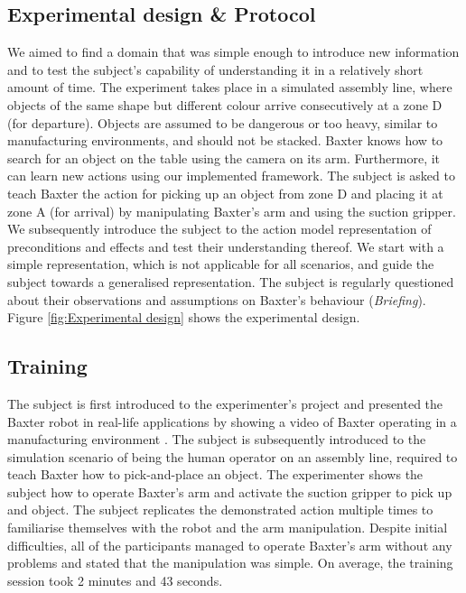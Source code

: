 \subsection{Experimental design \& Protocol}
We aimed to find a domain that was simple enough to introduce new information and to test the subject's capability of understanding it in a relatively short amount of time. The experiment takes place in a simulated assembly line, where objects of the same shape but different colour arrive consecutively at a zone D (for departure). Objects are assumed to be dangerous or too heavy, similar to manufacturing environments, and should not be stacked. Baxter knows how to search for an object on the table using the camera on its arm. Furthermore, it can learn new actions using our implemented framework. The subject is asked to teach Baxter the action for picking up an object from zone D and placing it at zone A (for arrival) by manipulating Baxter's arm and using the suction gripper. We subsequently introduce the subject to the action model representation of preconditions and effects and test their understanding thereof. We start with a simple representation, which is not applicable for all scenarios, and guide the subject towards a generalised representation. The subject is regularly questioned about their observations and assumptions on Baxter's behaviour (\textit{Briefing}).
Figure \ref{fig:Experimental design} shows the experimental design.


\subsection{Training}
The subject is first introduced to the experimenter's project and presented the Baxter robot in real-life applications by showing a video of Baxter operating in a manufacturing environment \cite{BaxterYoutube}. The subject is subsequently introduced to the simulation scenario of being the human operator on an assembly line, required to teach Baxter how to pick-and-place an object. The experimenter shows the subject how to operate Baxter's arm and activate the suction gripper to pick up and object. The subject replicates the demonstrated action multiple times to familiarise themselves with the robot and the arm manipulation. Despite initial difficulties, all of the participants managed to operate Baxter's arm without any problems and stated that the manipulation was simple. On average, the training session took 2 minutes and 43 seconds.

